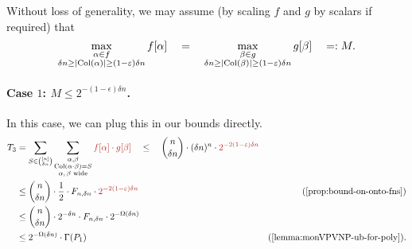 Without loss of generality, we may assume (by scaling $f$ and $g$ by scalars if required) that
\[
  \max_{\substack{\alpha \in f \\ \delta n \geq \left|\operatorname{Col}(\alpha)\right| \geq (1-\varepsilon)\delta n}} f[\alpha] \quad=\quad   \max_{\substack{\beta \in g \\ \delta n \geq \left|\operatorname{Col}(\beta)\right| \geq (1-\varepsilon)\delta n}}  g[\beta] \quad =: M.
\]
\paragraph{Case $1$: $M \leq 2^{-(1-\epsilon) \delta n}$.} In this case, we can plug this in our bounds directly.
\begin{align*}
  T_3 & = \sum_{S \in \binom{[n]}{\delta n}} \sum_{\substack{\alpha, \beta\\ \Col(\alpha \cdot \beta) = S \\ \text{$\alpha,\beta$ wide}}} \textcolor{BrickRed}{f[\alpha] \cdot g[\beta]} \quad \leq\quad \binom{n}{\delta n} \cdot (\delta n)^n\cdot \textcolor{BrickRed}{2^{-2(1-\epsilon)\delta n}} \\
      & \leq \binom{n}{\delta n} \cdot \frac{1}{2} \cdot F_{n,\delta n} \cdot \textcolor{BrickRed}{2^{-2(1-\epsilon)\delta n}} & \text{(\autoref{prop:bound-on-onto-fns})}\\
      & \leq \binom{n}{\delta n} \cdot 2^{-\delta n} \cdot F_{n,\delta n} \cdot 2^{-\Omega(\delta n)}\\
      & \leq 2^{-\Omega(\delta n)} \cdot \Gamma(P_1) & \text{(\autoref{lemma:monVPVNP-ub-for-poly})}.
\end{align*}

